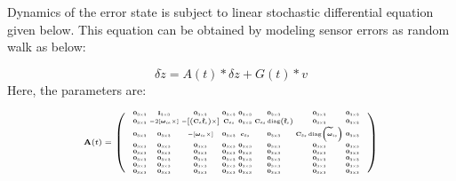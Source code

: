\documentclass[conference]{IEEEtran}
\begin{document}
Dynamics of the error state is subject to linear stochastic differential equation given below. This equation can be obtained by modeling sensor errors as random walk as below:

\begin{equation}
\delta \dot z = A(t)*\delta z + G(t)*v
\end{equation}
Here, the parameters are:

\begin{equation}
\tiny
\begin{aligned}
\mathbf{A}(t)=\left(\begin{array}{cccccccc}
\begin{smallmatrix}
\mathbf{0}_{3 \times 3} & \mathbf{I}_{3 \times 3} & \mathbf{0}_{3 \times 3} & \mathbf{0}_{3 \times 3} & \mathbf{0}_{3 \times 3} & \mathbf{0}_{3 \times 3} & \mathbf{0}_{3 \times 3} & \mathbf{0}_{3 \times 3} \\
\mathbf{0}_{3 \times 3} & -2\left[\boldsymbol{\omega}_{i e} \times\right] & -\left[\left(\mathbf{C}_{\tilde{e}} \hat{\mathbf{f}}_s\right) \times\right] & \mathbf{C}_{\tilde{e} s} & \mathbf{0}_{3 \times 3} & \mathbf{C}_{\tilde{e} s} \operatorname{diag}\left(\tilde{\mathbf{f}}_s\right) & \mathbf{0}_{3 \times 3} & \mathbf{0}_{3 \times 3} \\
\mathbf{0}_{3 \times 3} & \mathbf{0}_{3 \times 3} & -\left[\boldsymbol{\omega}_{i e} \times\right] & \mathbf{0}_{3 \times 3} & \mathbf{c}_{\tilde{e} s} & \mathbf{0}_{3 \times 3} & \mathbf{C}_{\tilde{e} s} \operatorname{diag}\left(\widetilde{\boldsymbol{\omega}}_{i s}\right) & \mathbf{0}_{3 \times 3} \\
\mathbf{0}_{3 \times 3} & \mathbf{0}_{3 \times 3} & \mathbf{0}_{3 \times 3} & \mathbf{0}_{3 \times 3} & \mathbf{0}_{3 \times 3} & \mathbf{0}_{3 \times 3} & \mathbf{0}_{3 \times 3} & \mathbf{0}_{3 \times 3} \\
\mathbf{0}_{3 \times 3} & \mathbf{0}_{3 \times 3} & \mathbf{0}_{3 \times 3} & \mathbf{0}_{3 \times 3} & \mathbf{0}_{3 \times 3} & \mathbf{0}_{3 \times 3} & \mathbf{0}_{3 \times 3} & \mathbf{0}_{3 \times 3} \\
\mathbf{0}_{3 \times 3} & \mathbf{0}_{3 \times 3} & \mathbf{0}_{3 \times 3} & \mathbf{0}_{3 \times 3} & \mathbf{0}_{3 \times 3} & \mathbf{0}_{3 \times 3} & \mathbf{0}_{3 \times 3} & \mathbf{0}_{3 \times 3} \\
\mathbf{0}_{3 \times 3} & \mathbf{0}_{3 \times 3} & \mathbf{0}_{3 \times 3} & \mathbf{0}_{3 \times 3} & \mathbf{0}_{3 \times 3} & \mathbf{0}_{3 \times 3} & \mathbf{0}_{3 \times 3} & \mathbf{0}_{3 \times 3} \\
\mathbf{0}_{3 \times 3} & \mathbf{0}_{3 \times 3} & \mathbf{0}_{3 \times 3} & \mathbf{0}_{3 \times 3} & \mathbf{0}_{3 \times 3} & \mathbf{0}_{3 \times 3} & \mathbf{0}_{3 \times 3} & \mathbf{0}_{3 \times 3}
\end{smallmatrix}
\end{array}\right)
\end{aligned}
\end{equation}
\end{document}
